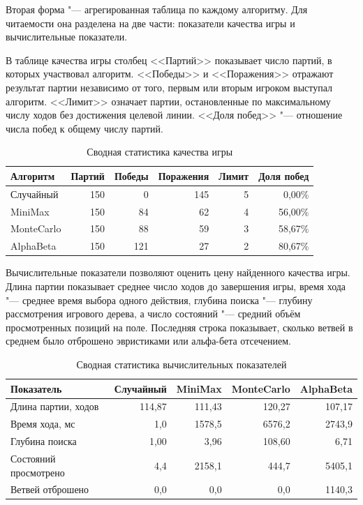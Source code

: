 \documentclass[a4paper,12pt]{diplom}
\newcommand{\goodcell}[1]{\cellcolor{WinHigh}#1}
\newcommand{\midcell}[1]{\cellcolor{WinMid}#1}
\newcommand{\badcell}[1]{\cellcolor{WinLow}#1}
\newcommand{\neutralcell}[1]{\cellcolor{MetricNeutral}#1}
\begin{document}
Вторая форма "--- агрегированная таблица по каждому алгоритму. Для читаемости она разделена на две части: показатели качества игры и вычислительные показатели.

В таблице качества игры столбец <<Партий>> показывает число партий, в которых участвовал алгоритм. <<Победы>> и <<Поражения>> отражают результат партии независимо от того, первым или вторым игроком выступал алгоритм. <<Лимит>> означает партии, остановленные по максимальному числу ходов без достижения целевой линии. <<Доля побед>> "--- отношение числа побед к общему числу партий.

\begin{table}[h]
\centering
\caption{Сводная статистика качества игры}
\label{tab:summary_quality}
\begin{tabular}{lrrrrr}
\toprule
Алгоритм & Партий & Победы & Поражения & Лимит & Доля побед \\
\midrule
Случайный  & \neutralcell{150} & \badcell{0}   & \badcell{145} & \badcell{5} & \badcell{0,00\%} \\
MiniMax    & \neutralcell{150} & \midcell{84}  & \midcell{62}  & \midcell{4} & \midcell{56,00\%} \\
MonteCarlo & \neutralcell{150} & \midcell{88}  & \midcell{59}  & \midcell{3} & \midcell{58,67\%} \\
AlphaBeta  & \neutralcell{150} & \goodcell{121} & \goodcell{27}  & \goodcell{2} & \goodcell{80,67\%} \\
\bottomrule
\end{tabular}
\end{table}

Вычислительные показатели позволяют оценить цену найденного качества игры. Длина партии показывает среднее число ходов до завершения игры, время хода "--- среднее время выбора одного действия, глубина поиска "--- глубину рассмотрения игрового дерева, а число состояний "--- средний объём просмотренных позиций на поле. Последняя строка показывает, сколько ветвей в среднем было отброшено эвристиками или альфа-бета отсечением.

\begin{table}[h]
\centering
\caption{Сводная статистика вычислительных показателей}
\label{tab:summary_cost}
\begin{tabular}{lrrrr}
\toprule
Показатель & Случайный & MiniMax & MonteCarlo & AlphaBeta \\
\midrule
Длина партии, ходов & \midcell{114,87} & \midcell{111,43} & \badcell{120,27} & \goodcell{107,17} \\
Время хода, мс & \goodcell{1,0} & \goodcell{1578,5} & \badcell{6576,2} & \midcell{2743,9} \\
Глубина поиска & \badcell{1,00} & \midcell{3,96} & \goodcell{108,60} & \midcell{6,71} \\
Состояний просмотрено & \goodcell{4,4} & \midcell{2158,1} & \goodcell{444,7} & \badcell{5405,1} \\
Ветвей отброшено & \neutralcell{0,0} & \neutralcell{0,0} & \neutralcell{0,0} & \goodcell{1140,3} \\
\bottomrule
\end{tabular}
\end{table}
\end{document}

